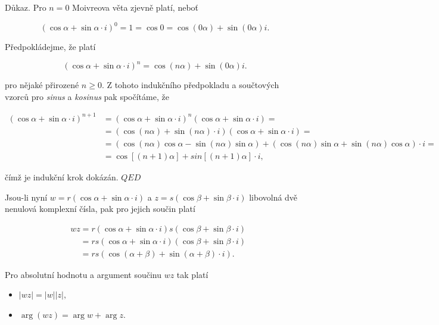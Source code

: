\documentclass[12pt,a4paper]{report}
\begin{document}
	Důkaz. Pro $n = 0$ Moivreova věta zjevně platí, neboť
	
	\begin{equation}
		(\cos\alpha+\sin\alpha\cdot i)^0 = 1 = \cos 0 = \cos(0\alpha) + \sin(0\alpha)i.
	\end{equation}
	
	Předpokládejme, že platí
	
	\begin{equation}
		(\cos\alpha+\sin\alpha\cdot i)^n = \cos(n\alpha) + \sin(0\alpha)i.
	\end{equation}
	
	pro nějaké přirozené $n \ge 0$. Z tohoto indukčního předpokladu a součtových vzorců pro \textit{sinus} a \textit{kosinus} pak spočítáme, že
	
	\begin{align}
		(\cos\alpha + \sin\alpha\cdot i)^{n+1}&= (\cos\alpha + \sin\alpha\cdot i)^n(\cos\alpha + \sin\alpha\cdot i) =\\
		&= (\cos(n\alpha) + \sin(n\alpha)\cdot i)(\cos\alpha + \sin\alpha\cdot i) =\\
		&= (\cos(n\alpha)\cos\alpha - \sin(n\alpha)\sin\alpha)+(\cos(n\alpha)\sin\alpha + \sin(n\alpha)\cos\alpha)\cdot i =\\
		&= \cos[(n+1)\alpha] + sin[(n+1)\alpha]\cdot i,
	\end{align}
	
	čímž je indukční krok dokázán. \hfill$QED$
	
	\medskip
	
	Jsou-li nyní $w = r(\cos\alpha + \sin\alpha\cdot i)$ a $z = s(\cos\beta + \sin\beta\cdot i)$ libovolná dvě nenulová komplexní čísla, pak pro jejich součin platí
	
	\begin{align}
		&wz = r(\cos\alpha + \sin\alpha\cdot i)s(\cos\beta + \sin\beta\cdot i)\\
		&\phantom{wz} = rs(\cos\alpha + \sin\alpha\cdot i)(\cos\beta + \sin\beta\cdot i)\\
		&\phantom{wz} = rs(\cos(\alpha + \beta) + \sin(\alpha + \beta)\cdot i).
	\end{align}
	
	Pro absolutní hodnotu a argument součinu $wz$ tak platí
	
	\begin{itemize}
		\item $|wz| = |w||z|,$
		\item $\arg(wz) = \arg w + \arg z.$
	\end{itemize}
	
\end{document}
